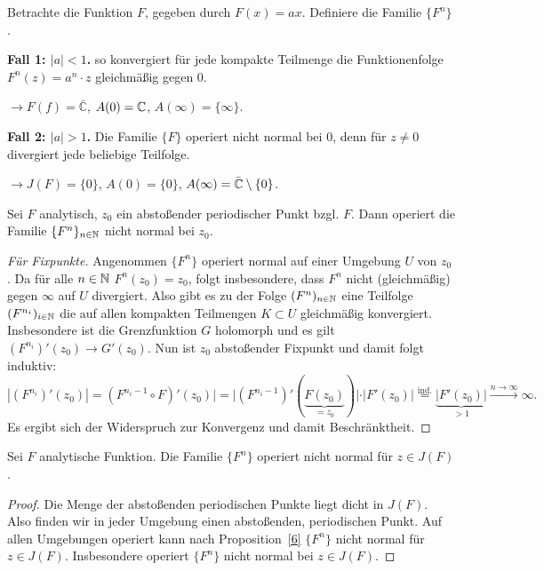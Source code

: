\documentclass{mywork}
\begin{document}
\begin{ex}\label{5}
Betrachte die Funktion $F$, gegeben durch $F(x)=ax$. Definiere die Familie $\{F^n\}$.

\textbf{Fall 1: $|a|<1$.} so konvergiert für jede kompakte Teilmenge die Funktionenfolge $F^n(z)=a^n\cdot z$ gleichmäßig gegen 0. 

$\longrightarrow F(f)=\bar{\mathbb{C}}$, $A(0)=\mathbb{C}$, $A(\infty)=\{\infty\}$.

\textbf{Fall 2: $|a|>1$.} Die Familie $\{F\}$ operiert nicht normal bei $0$, denn für $z\neq 0$ divergiert jede beliebige Teilfolge.

$\longrightarrow J(F)=\{0\}$, $A(0)=\{0\}$, $A(\infty)=\bar{\mathbb{C}}\setminus \{0\}$. 
\end{ex}



\begin{prop}\label{6}
Sei $F$ analytisch, $z_0$ ein abstoßender periodischer Punkt bzgl. $F$. Dann operiert die Familie $\{F^n\}_{n\in \mathbb{N}}$ nicht normal bei $z_0$.
\end{prop}
\begin{proof}[Für Fixpunkte]
 Angenommen $\{F^n\}$ operiert normal auf einer Umgebung $U$ von $z_0$. Da für alle $n\in \mathbb{N}$ $F^n(z_0)=z_0$, folgt insbesondere, dass $F^n$ nicht (gleichmäßig) gegen $\infty$ auf $U$ divergiert. Also gibt es zu der Folge $(F^n)_{n\in \mathbb{N}}$ eine Teilfolge $(F^{n_i})_{i\in \mathbb{N}}$ die auf allen kompakten Teilmengen $K\subset U$ gleichmäßig konvergiert. Insbesondere ist die Grenzfunktion $G$ holomorph und es gilt $(F^{n_i})'(z_0) \to G'(z_0)$. Nun ist $z_0$ abstoßender Fixpunkt und damit folgt induktiv:
 \[
 	|(F^{n_i})'(z_0)|=(F^{n_i-1} \circ F)'(z_0)|=|(F^{n_i-1})'(\underbrace{F(z_0)}_{=z_0})|\cdot |F'(z_0)| \stackrel{\text{ind.}}{=} \underbrace{|F'(z_0)|}_{>1} \stackrel{n\to \infty}\to \infty.
 \]
 Es ergibt sich der Widerspruch zur Konvergenz und damit Beschränktheit.
\end{proof}



\begin{kor} \label{7}
Sei $F$ analytische Funktion. Die Familie $\{F^n\}$ operiert nicht normal für $z\in J(F)$.
\end{kor}

\begin{proof}
Die Menge der abstoßenden periodischen Punkte liegt dicht in $J(F)$. Also finden wir in jeder Umgebung einen abstoßenden, periodischen Punkt. Auf allen Umgebungen operiert kann nach Proposition~\ref{6} $\{F^n\}$ nicht normal für $z\in J(F)$. Insbesondere operiert $\{F^n\}$ nicht normal bei $z\in J(F)$.
\end{proof}
\end{document}
